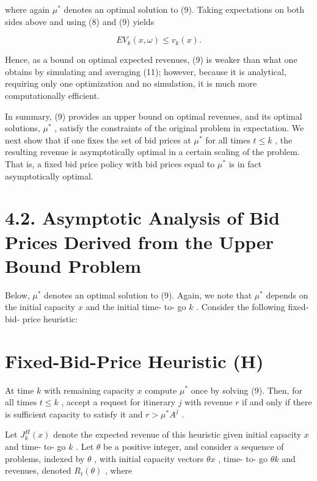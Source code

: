where again \(\mu^{*}\) denotes an optimal solution to (9). Taking
expectations on both sides above and using (8) and (9) yields

\[
E V_{k}(x,\omega)\leq v_{k}(x).
\]

Hence, as a bound on optimal expected revenues, (9) is weaker than what
one obtains by simulating and averaging (11); however, because it is
analytical, requiring only one optimization and no simulation, it is
much more computationally efficient.

In summary, (9) provides an upper bound on optimal revenues, and its
optimal solutions, \(\mu^{*}\) , satisfy the constraints of the original
problem in expectation. We next show that if one fixes the set of bid
prices at \(\mu^{*}\) for all times \(t \leq k\) , the resulting revenue
is asymptotically optimal in a certain scaling of the problem. That is,
a fixed bid price policy with bid prices equal to \(\mu^{*}\) is in fact
asymptotically optimal.

\section{4.2. Asymptotic Analysis of Bid Prices Derived from the Upper
Bound
Problem}\label{asymptotic-analysis-of-bid-prices-derived-from-the-upper-bound-problem}

Below, \(\mu^{*}\) denotes an optimal solution to (9). Again, we note
that \(\mu^{*}\) depends on the initial capacity \(x\) and the initial
time- to- go \(k\) . Consider the following fixed- bid- price heuristic:

\section{Fixed-Bid-Price Heuristic
(H)}\label{fixed-bid-price-heuristic-h}

At time \(k\) with remaining capacity \(x\) compute \(\mu^{*}\) once by
solving (9). Then, for all times \(t \leq k\) , accept a request for
itinerary \(j\) with revenue \(r\) if and only if there is sufficient
capacity to satisfy it and \(r > \mu^{*}A^{j}\) .

Let \(J_{k}^{H}(x)\) denote the expected revenue of this heuristic given
initial capacity \(x\) and time- to- go \(k\) . Let \(\theta\) be a
positive integer, and consider a sequence of problems, indexed by
\(\theta\) , with initial capacity vectors \(\theta x\) , time- to- go
\(\theta k\) and revenues, denoted \(R_{t}(\theta)\) , where

